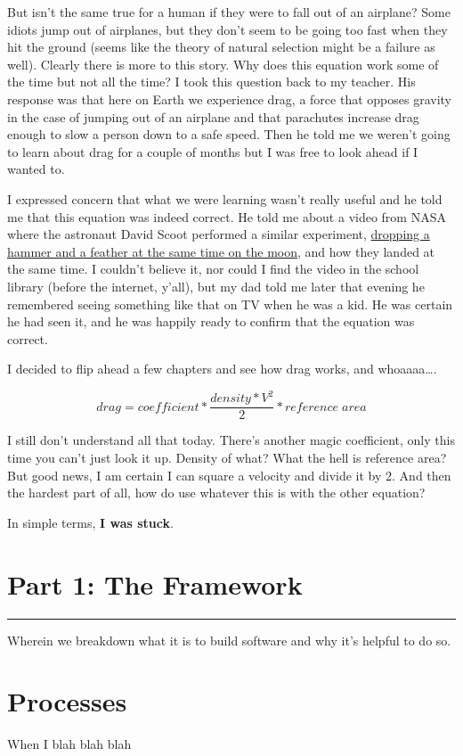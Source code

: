 \documentclass[]{book}
\begin{document}
But isn't the same true for a human if they were to fall out of an airplane? Some idiots jump out of airplanes, but they don't seem to be going too fast when they hit the ground (seems like the theory of natural selection might be a failure as well). Clearly there is more to this story. Why does this equation work some of the time but not all the time? I took this question back to my teacher. His response was that here on Earth we experience drag, a force that opposes gravity in the case of jumping out of an airplane and that parachutes increase drag enough to slow a person down to a safe speed. Then he told me we weren't going to learn about drag for a couple of months but I was free to look ahead if I wanted to.

I expressed concern that what we were learning wasn't really useful and he told me that this equation was indeed correct. He told me about a video from NASA where the astronaut David Scoot performed a similar experiment, \href{https://nssdc.gsfc.nasa.gov/planetary/lunar/apollo_15_feather_drop.html}{dropping a hammer and a feather at the same time on the moon}, and how they landed at the same time. I couldn't believe it, nor could I find the video in the school library (before the internet, y'all), but my dad told me later that evening he remembered seeing something like that on TV when he was a kid. He was certain he had seen it, and he was happily ready to confirm that the equation was correct.

I decided to flip ahead a few chapters and see how drag works, and whoaaaa\ldots{}.

\[drag = coefficient * \frac{density * V^2}{2} * reference\;area\]

I still don't understand all that today. There's another magic coefficient, only this time you can't just look it up. Density of what? What the hell is reference area? But good news, I am certain I can square a velocity and divide it by 2. And then the hardest part of all, how do use whatever this is with the other equation?

In simple terms, \textbf{I was stuck}.

\hypertarget{part1}{%
\chapter*{Part 1: The Framework}\label{part1}}

\begin{center}\rule{0.5\linewidth}{0.5pt}\end{center}

Wherein we breakdown what it is to build software and why it's helpful to do so.

\hypertarget{processes}{%
\chapter{Processes}\label{processes}}

When I blah blah blah


\end{document}
